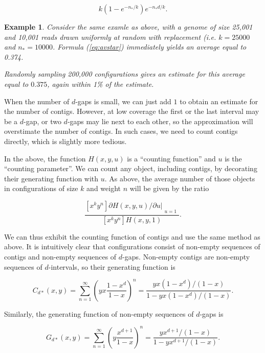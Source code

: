 \documentclass{article}
\newtheorem{example}{Example}
\begin{document}
\begin{equation}
\label{eq:avstar}
k(1-e^{-n_*/k})e^{-n_*d/k}.
\end{equation}

\begin{example}
Consider the same examle as above, with a genome of size 25,001 and 10,001
reads drawn uniformly at random with replacement (\textit{i.e.} $k =
25000$ and $n_* = 10000$. Formula (\ref{eq:avstar}) immediately yields an
average equal to 0.374.

Randomly sampling 200,000 configurations gives an estimate for this
average equal to $0.375$, again within 1\% of the estimate.
\end{example}

When the number of $d$-gaps is small, we can just add $1$ to obtain an
estimate for the number of contigs. However, at low coverage the first or
the last interval may be a $d$-gap, or two $d$-gaps may lie next to each
other, so the approximation will overstimate the number of contigs. In
such cases, we need to count contigs directly, which is slightly more
tedious.

In the above, the function $H(x,y,u)$ is a ``counting function'' and $u$
is the ``counting parameter''. We can count any object, including contigs,
by decorating their generating function with $u$. As above, the average
number of those objects in configurations of size $k$ and weight $n$ will
be given by the ratio

\begin{equation*}
\frac{[x^ky^n] \partial H(x,y,u)/\partial u|_{\substack{\\u=1}}}
{[x^ky^n]H(x,y,1)}.
\end{equation*}

We can thus exhibit the counting function of contigs and use the same
method as above. It is intuitively clear that configurations consist of
non-empty sequences of contigs and non-empty sequences of $d$-gaps.
Non-empty contigs are non-empty sequences of $d$-intervals, so their
generating function is

\begin{equation*}
C_{d*}(x,y) = \sum_{n=1}^\infty \left(yx\frac{1-x^d}{1-x} \right)^n
= \frac{yx(1-x^d)/(1-x)}{1-yx(1-x^d)/(1-x)}.
\end{equation*}

Similarly, the generating function of non-empty sequences of $d$-gaps is

\begin{equation*}
G_{d*}(x,y) = \sum_{n=1}^\infty \left(y\frac{x^{d+1}}{1-x} \right)^n
= \frac{yx^{d+1}/(1-x)}{1-yx^{d+1}/(1-x)}.
\end{equation*}
\end{document}
